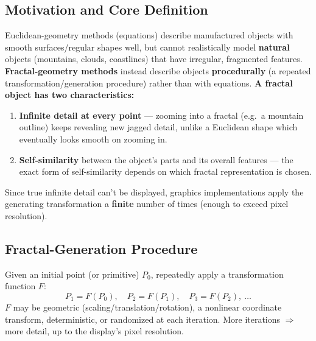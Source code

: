 \documentclass[12pt, a4paper]{article}
\newenvironment{answerbox}{\begin{mdframed}[style=answerframe]}{\end{mdframed}}
\begin{document}
\subsection{Motivation and Core Definition}
\begin{answerbox}
Euclidean-geometry methods (equations) describe manufactured objects with smooth surfaces/regular shapes well, but cannot realistically model \textbf{natural} objects (mountains, clouds, coastlines) that have irregular, fragmented features. \textbf{Fractal-geometry methods} instead describe objects \textbf{procedurally} (a repeated transformation/generation procedure) rather than with equations.
\textbf{A fractal object has two characteristics:}
\begin{enumerate}[noitemsep]
  \item \textbf{Infinite detail at every point} — zooming into a fractal (e.g.\ a mountain outline) keeps revealing new jagged detail, unlike a Euclidean shape which eventually looks smooth on zooming in.
  \item \textbf{Self-similarity} between the object's parts and its overall features — the exact form of self-similarity depends on which fractal representation is chosen.
\end{enumerate}
Since true infinite detail can't be displayed, graphics implementations apply the generating transformation a \textbf{finite} number of times (enough to exceed pixel resolution).
\end{answerbox}

\subsection{Fractal-Generation Procedure}
\begin{answerbox}
Given an initial point (or primitive) $P_0$, repeatedly apply a transformation function $F$:
$$P_1 = F(P_0), \quad P_2 = F(P_1), \quad P_3 = F(P_2), \ \ldots$$
$F$ may be geometric (scaling/translation/rotation), a nonlinear coordinate transform, deterministic, or randomized at each iteration. More iterations $\Rightarrow$ more detail, up to the display's pixel resolution.
\end{answerbox}
\end{document}
